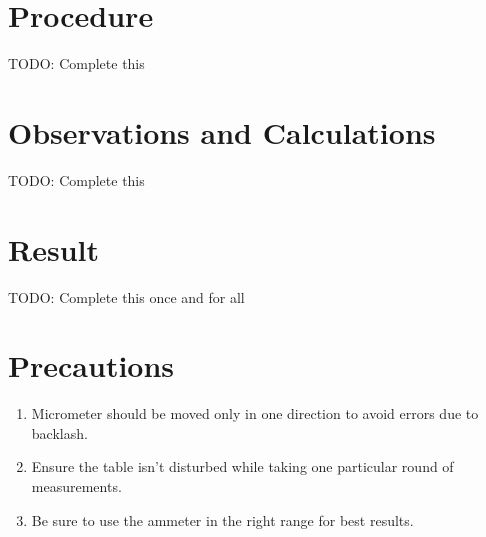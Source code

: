\section{Procedure}
	TODO: Complete this
	
\section{Observations and Calculations}	
	TODO: Complete this

\section{Result}
	TODO: Complete this once and for all
	
\section{Precautions}
	\begin{enumerate}		
		\item Micrometer should be moved only in one direction to avoid errors due to backlash.
		\item Ensure the table isn't disturbed while taking one particular round of measurements.
		\item Be sure to use the ammeter in the right range for best results.
	\end{enumerate}